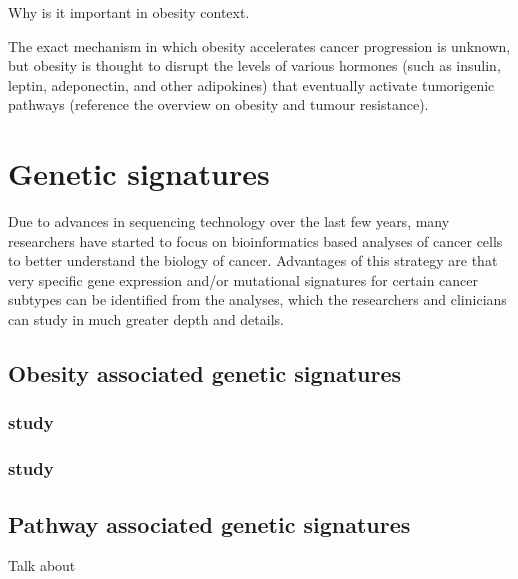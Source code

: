 Why is it important in obesity context.

The exact mechanism in which obesity accelerates cancer progression is unknown, but obesity is thought to disrupt the levels of various hormones (such as insulin, leptin, adeponectin, and other adipokines) that eventually activate tumorigenic pathways (reference the overview on obesity and tumour resistance).

\section{Genetic signatures}
\label{sec:genetic_signatures}

Due to advances in sequencing technology over the last few years, many researchers have started to focus on bioinformatics based analyses of cancer cells to better understand the biology of cancer.
Advantages of this strategy are that very specific gene expression and/or mutational signatures for certain cancer subtypes can be identified from the analyses, which the researchers and clinicians can study in much greater depth and details.


\subsection{Obesity associated genetic signatures}
\label{subsec:obesity_associated_genetic_signatures}

\subsubsection{ \textbf{\citet{Creighton2012} study}}
\label{ssub:creighton_study}



\subsubsection{ \textbf{\citet{Fuentes-Mattei2014} study}}
\label{ssub:fuentes_mattei_study}




\subsection{Pathway associated genetic signatures}
\label{sub:pathway_associated_genetic_signatures}

Talk about \citet{Gatza2010a}






